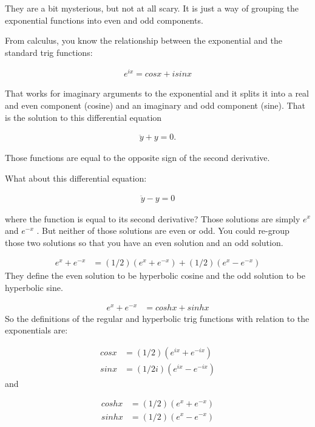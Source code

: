 They are a bit mysterious, but not at all scary. It is just a way of grouping the exponential
functions into even and odd components.

From calculus, you know the relationship between the exponential and the standard trig functions:

\begin{align*}
e^{ix} = cos x + i sin x
\end{align*}

That works for imaginary arguments to the exponential and it splits it into a real and even
component (cosine) and an imaginary and odd component (sine). That is the solution to this
differential equation

\begin{align*}
  \ddot{y} + y = 0.
\end{align*}

Those functions are equal to the opposite sign of the second
derivative.

What about this differential equation:

\begin{align*}
  \ddot{y} - y = 0
\end{align*}

where the function is equal to its second derivative? Those solutions are simply $e^x$ and $e^{-x}$
. But neither of those solutions are even or odd. You could re-group those two solutions so that you
have an even solution and an odd solution.

\begin{align*}
e^x + e^{-x} &= (1/2) (e^x + e^{-x} ) + (1/2) (e^x - e^{-x} )
\end{align*}
They define the even solution to be hyperbolic cosine and the odd solution to be hyperbolic sine.

\begin{align*}
e^x + e^{-x} &= cosh x + sinh x
\end{align*}
So the definitions of the regular and hyperbolic trig functions with relation to the exponentials
are:

\begin{align*}
cos x &= (1/2) ( e^{ix} + e^{-ix} ) \\
sin x &= (1/2i) ( e^{ix} - e^{-ix} )
\end{align*}
and

\begin{align*}
cosh x &= (1/2) ( e^x + e^{-x} ) \\
sinh x &= (1/2) ( e^x - e^{-x} )
\end{align*}

